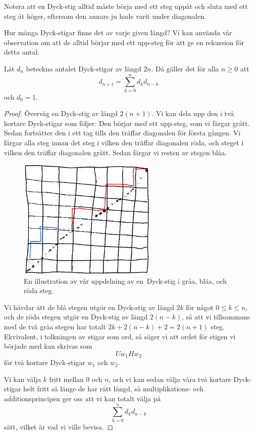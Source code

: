\documentclass{tufte-handout}
\begin{document}
Notera att en Dyck-stig alltid måste börja med ett steg uppåt och sluta med ett steg åt höger, eftersom den annars ju hade varit under diagonalen.

Hur många Dyck-stigar finns det av varje given längd? Vi kan använda vår observation om att de alltid börjar med ett upp-steg för att ge en rekursion för detta antal:

\begin{lemma}\label{dyck_path_recursion_lemma}
    Låt $d_n$ beteckna antalet Dyck-stigar av längd $2n$. Då gäller det för alla $n \geq 0$ att
    $$d_{n+1} = \sum_{k=0}^{n} d_k d_{n-k}$$
    och $d_0 = 1$.

    \begin{proof}
        Överväg en Dyck-stig av längd $2(n+1)$. Vi kan dela upp den i två kortare Dyck-stigar som följer: Den börjar med ett upp-steg, som vi färgar grått. Sedan fortsätter den i ett tag tills den träffar diagonalen för första gången. Vi färgar alla steg innan det steg i vilken den träffar diagonalen röda, och steget i vilken den träffar diagonalen grått. Sedan färgar vi resten av stegen blåa.

        \begin{figure}
            \centering
            \includegraphics[width = 0.6\textwidth]{graphics/Dyck_path_recursion.png}
            \caption{En illustration av vår uppdelning av en\, Dyck-stig i gråa, blåa, och röda steg.}
        \end{figure}

        Vi hävdar att de blå stegen utgör en Dyck-stig av längd $2k$ för något $0 \leq k \leq n$, och de röda stegen utgör en Dyck-stig av längd $2(n-k)$, så att vi tillsammans med de två gråa stegen har totalt $2k + 2(n-k) + 2 = 2(n+1)$ steg. Ekvivalent, i tolkningen av stigar som ord, så säger vi att ordet för stigen vi började med kan skrivas som
        $$Uw_1Hw_2$$
        för två kortare Dyck-stigar $w_1$ och $w_2$.

        Vi kan välja $k$ fritt mellan $0$ och $n$, och vi kan sedan välja våra två kortare Dyck-stigar helt fritt så länge de har rätt längd, så multiplikations- och additionsprincipen ger oss att vi kan totalt välja på
        $$\sum_{k=0}^{n} d_k d_{n-k}$$
        sätt, vilket är vad vi ville bevisa.
    \end{proof}
\end{lemma}
\end{document}
